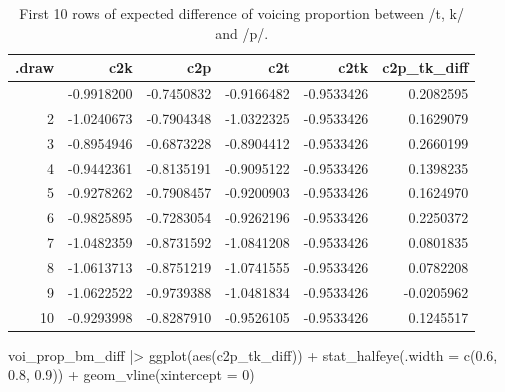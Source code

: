\documentclass[
  authoryear,
  preprint,
  3p]{elsarticle}
\newenvironment{Shaded}{\begin{snugshade}}{\end{snugshade}}
\newcommand{\AttributeTok}[1]{\textcolor[rgb]{0.40,0.45,0.13}{#1}}
\newcommand{\DecValTok}[1]{\textcolor[rgb]{0.68,0.00,0.00}{#1}}
\newcommand{\FloatTok}[1]{\textcolor[rgb]{0.68,0.00,0.00}{#1}}
\newcommand{\FunctionTok}[1]{\textcolor[rgb]{0.28,0.35,0.67}{#1}}
\newcommand{\NormalTok}[1]{\textcolor[rgb]{0.00,0.23,0.31}{#1}}
\newcommand{\SpecialCharTok}[1]{\textcolor[rgb]{0.37,0.37,0.37}{#1}}
\begin{document}
\begin{longtable}[]{@{}rrrrrr@{}}

\caption{\label{tbl-voi-pbd}First 10 rows of expected difference of
voicing proportion between /t, k/ and /p/.}

\tabularnewline

\toprule\noalign{}
.draw & c2k & c2p & c2t & c2tk & c2p\_tk\_diff \\
\midrule\noalign{}
\endhead
\bottomrule\noalign{}
\endlastfoot
1 & -0.9918200 & -0.7450832 & -0.9166482 & -0.9533426 & 0.2082595 \\
2 & -1.0240673 & -0.7904348 & -1.0322325 & -0.9533426 & 0.1629079 \\
3 & -0.8954946 & -0.6873228 & -0.8904412 & -0.9533426 & 0.2660199 \\
4 & -0.9442361 & -0.8135191 & -0.9095122 & -0.9533426 & 0.1398235 \\
5 & -0.9278262 & -0.7908457 & -0.9200903 & -0.9533426 & 0.1624970 \\
6 & -0.9825895 & -0.7283054 & -0.9262196 & -0.9533426 & 0.2250372 \\
7 & -1.0482359 & -0.8731592 & -1.0841208 & -0.9533426 & 0.0801835 \\
8 & -1.0613713 & -0.8751219 & -1.0741555 & -0.9533426 & 0.0782208 \\
9 & -1.0622522 & -0.9739388 & -1.0481834 & -0.9533426 & -0.0205962 \\
10 & -0.9293998 & -0.8287910 & -0.9526105 & -0.9533426 & 0.1245517 \\

\end{longtable}

\begin{Shaded}
\begin{Highlighting}[]
\NormalTok{voi\_prop\_bm\_diff }\SpecialCharTok{|\textgreater{}} 
  \FunctionTok{ggplot}\NormalTok{(}\FunctionTok{aes}\NormalTok{(c2p\_tk\_diff)) }\SpecialCharTok{+}
  \FunctionTok{stat\_halfeye}\NormalTok{(}\AttributeTok{.width =} \FunctionTok{c}\NormalTok{(}\FloatTok{0.6}\NormalTok{, }\FloatTok{0.8}\NormalTok{, }\FloatTok{0.9}\NormalTok{)) }\SpecialCharTok{+}
  \FunctionTok{geom\_vline}\NormalTok{(}\AttributeTok{xintercept =} \DecValTok{0}\NormalTok{)}
\end{Highlighting}
\end{Shaded}
\end{document}
